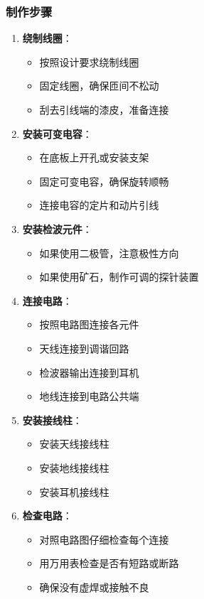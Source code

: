 \documentclass[12pt,UTF8]{ctexbook}
\begin{document}
\subsubsection{制作步骤}

\begin{enumerate}[leftmargin=3.5em]
    \item \textbf{绕制线圈}：
        \begin{itemize}[leftmargin=3.5em]
            \item 按照设计要求绕制线圈
            \item 固定线圈，确保匝间不松动
            \item 刮去引线端的漆皮，准备连接
        \end{itemize}
    
    \item \textbf{安装可变电容}：
        \begin{itemize}[leftmargin=3.5em]
            \item 在底板上开孔或安装支架
            \item 固定可变电容，确保旋转顺畅
            \item 连接电容的定片和动片引线
        \end{itemize}
    
    \item \textbf{安装检波元件}：
        \begin{itemize}[leftmargin=3.5em]
            \item 如果使用二极管，注意极性方向
            \item 如果使用矿石，制作可调的探针装置
        \end{itemize}
    
    \item \textbf{连接电路}：
        \begin{itemize}[leftmargin=3.5em]
            \item 按照电路图连接各元件
            \item 天线连接到调谐回路
            \item 检波器输出连接到耳机
            \item 地线连接到电路公共端
        \end{itemize}
    
    \item \textbf{安装接线柱}：
        \begin{itemize}[leftmargin=3.5em]
            \item 安装天线接线柱
            \item 安装地线接线柱
            \item 安装耳机接线柱
        \end{itemize}
    
    \item \textbf{检查电路}：
        \begin{itemize}[leftmargin=3.5em]
            \item 对照电路图仔细检查每个连接
            \item 用万用表检查是否有短路或断路
            \item 确保没有虚焊或接触不良
        \end{itemize}
\end{enumerate}
\end{document}
